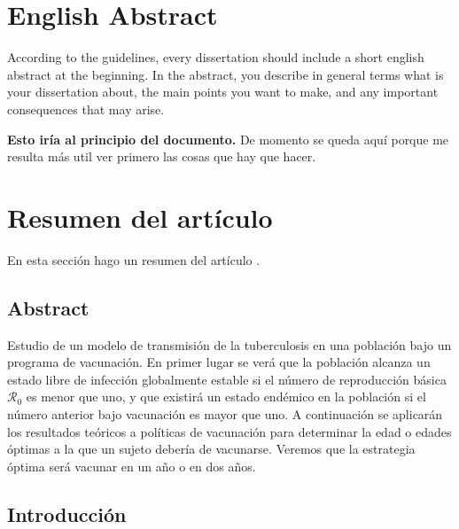 \documentclass[
]{book}
\begin{document}
\hypertarget{english-abstract}{%
\chapter*{English Abstract}\label{english-abstract}}

According to the guidelines, every dissertation should include a short english abstract at the beginning. In the abstract, you describe in general terms what is your dissertation about, the main points you want to make, and any important consequences that may arise.

\textbf{Esto iría al principio del documento.} De momento se queda aquí porque me resulta más util ver primero las cosas que hay que hacer.

\hypertarget{resumen-del-artuxedculo}{%
\chapter{Resumen del artículo}\label{resumen-del-artuxedculo}}

En esta sección hago un resumen del artículo \citet{castillo-chavez_global_1998}.

\hypertarget{abstract}{%
\section*{Abstract}\label{abstract}}

Estudio de un modelo de transmisión de la tuberculosis en una población bajo un programa de vacunación. En primer lugar se verá que la población alcanza un estado libre de infección globalmente estable si el número de reproducción básica \(\mathscr{R_0}\) es menor que uno, y que existirá un estado endémico en la población si el número anterior bajo vacunación es mayor que uno. A continuación se aplicarán los resultados teóricos a políticas de vacunación para determinar la edad o edades óptimas a la que un sujeto debería de vacunarse. Veremos que la estrategia óptima será vacunar en un año o en dos años.

\hypertarget{introducciuxf3n}{%
\section{Introducción}\label{introducciuxf3n}}
\end{document}
